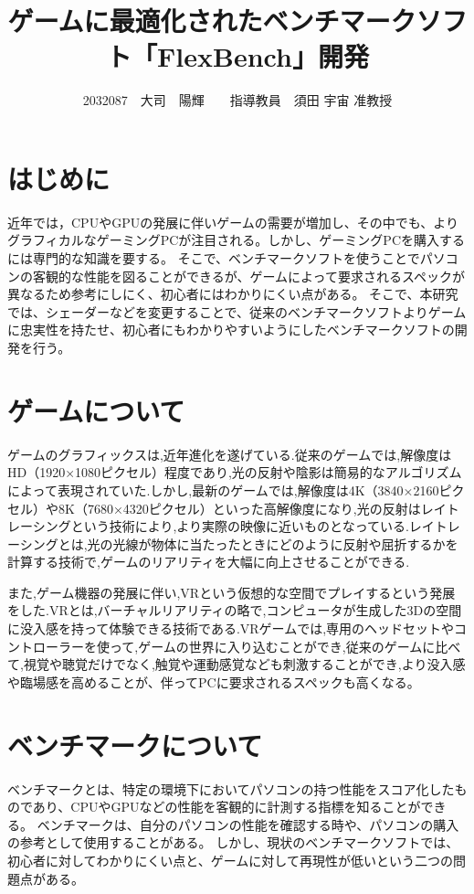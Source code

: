 \documentclass[twocolumn,10pt,a4j]{ltjsarticle}
\title{ゲームに最適化されたベンチマークソフト「FlexBench」開発}
\author{2032087　大司　陽輝　　指導教員　須田 宇宙 准教授}
\date{}
\begin{document}
\maketitle

\section{はじめに}
近年では，CPUやGPUの発展に伴いゲームの需要が増加し、その中でも、よりグラフィカルなゲーミングPCが注目される。しかし、ゲーミングPCを購入するには専門的な知識を要する。
そこで、ベンチマークソフトを使うことでパソコンの客観的な性能を図ることができるが、ゲームによって要求されるスペックが異なるため参考にしにく、初心者にはわかりにくい点がある。
そこで、本研究では、シェーダーなどを変更することで、従来のベンチマークソフトよりゲームに忠実性を持たせ、初心者にもわかりやすいようにしたベンチマークソフトの開発を行う。

\section{ゲームについて}
ゲームのグラフィックスは,近年進化を遂げている.従来のゲームでは,解像度はHD（1920×1080ピクセル）程度であり,光の反射や陰影は簡易的なアルゴリズムによって表現されていた.しかし,最新のゲームでは,解像度は4K（3840×2160ピクセル）や8K（7680×4320ピクセル）といった高解像度になり,光の反射はレイトレーシングという技術により,より実際の映像に近いものとなっている.レイトレーシングとは,光の光線が物体に当たったときにどのように反射や屈折するかを計算する技術で,ゲームのリアリティを大幅に向上させることができる.

また,ゲーム機器の発展に伴い,VRという仮想的な空間でプレイするという発展をした.VRとは,バーチャルリアリティの略で,コンピュータが生成した3Dの空間に没入感を持って体験できる技術である.VRゲームでは,専用のヘッドセットやコントローラーを使って,ゲームの世界に入り込むことができ,従来のゲームに比べて,視覚や聴覚だけでなく,触覚や運動感覚なども刺激することができ,より没入感や臨場感を高めることが、伴ってPCに要求されるスペックも高くなる。

\section{ベンチマークについて}
ベンチマークとは、特定の環境下においてパソコンの持つ性能をスコア化したものであり、CPUやGPUなどの性能を客観的に計測する指標を知ることができる。
ベンチマークは、自分のパソコンの性能を確認する時や、パソコンの購入の参考として使用することがある。
しかし、現状のベンチマークソフトでは、初心者に対してわかりにくい点と、ゲームに対して再現性が低いという二つの問題点がある。
\end{document}
